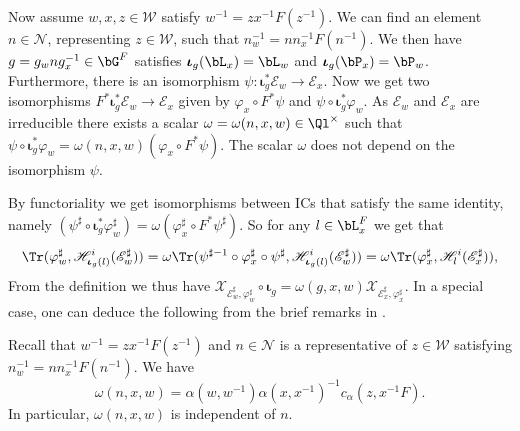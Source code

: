 \documentclass[eqthmnum,nocolour,skinny]{jt-calcs}
\begin{document}
\begin{pa}
Now assume $w,x,z \in \mathcal{W}$ satisfy $w^{-1} = zx^{-1}F(z^{-1})$. We can find an element $n \in \mathcal{N}$, representing $z \in \mathcal{W}$, such that $n_w^{-1} = nn_x^{-1}F(n^{-1})$. We then have $g = g_wng_x^{-1} \in \bG^F$ satisfies $\boldsymbol{\iota}_g(\bL_x) = \bL_w$ and $\boldsymbol{\iota}_g(\bP_x) = \bP_w$. Furthermore, there is an isomorphism $\psi : \boldsymbol{\iota}_g^*\mathscr{E}_w \to \mathscr{E}_x$. Now we get two isomorphisms $F^*\boldsymbol{\iota}_g^*\mathscr{E}_w \to \mathscr{E}_x$ given by $\varphi_x \circ F^*\psi$ and $\psi\circ \boldsymbol{\iota}_g^*\varphi_w$. As $\mathscr{E}_w$ and $\mathscr{E}_x$ are irreducible there exists a scalar $\omega = \omega(n,x,w) \in \Ql^{\times}$ such that $\psi\circ \boldsymbol{\iota}_g^*\varphi_w = \omega(n,x,w)(\varphi_x \circ F^*\psi)$. The scalar $\omega$ does not depend on the isomorphism $\psi$.
\end{pa}

\begin{pa}
By functoriality we get isomorphisms between ICs that satisfy the same identity, namely $(\psi^{\sharp}\circ \boldsymbol{\iota}_g^*\varphi_w^{\sharp}) = \omega(\varphi_x^{\sharp} \circ F^*\psi^{\sharp})$. So for any $l \in \bL_x^F$ we get that
\begin{equation*}
\Tr(\varphi_w^{\sharp},\mathscr{H}_{\boldsymbol{\iota}_g(l)}^i(\mathscr{E}_w^{\sharp})) = \omega\Tr(\psi^{\sharp -1}\circ\varphi_x^{\sharp} \circ \psi^{\sharp},\mathscr{H}_{\boldsymbol{\iota}_g(l)}^i(\mathscr{E}_w^{\sharp})) = \omega\Tr(\varphi_x^{\sharp},\mathscr{H}_l^i(\mathscr{E}_x^{\sharp})),
\end{equation*}
From the definition we thus have $\mathcal{X}_{\mathscr{E}_w^{\sharp},\varphi_w^{\sharp}} \circ \boldsymbol{\iota}_g = \omega(g,x,w)\mathcal{X}_{\mathscr{E}_x^{\sharp},\varphi_x^{\sharp}}$. In a special case, one can deduce the following from the brief remarks in \cite[10.6.4, 10.6.5]{lusztig:1985:character-sheaves}.
\end{pa}

\begin{prop}\label{prop:conj-scalar-calc}
Recall that $w^{-1} = zx^{-1}F(z^{-1})$ and $n \in \mathcal{N}$ is a representative of $z \in \mathcal{W}$ satisfying $n_w^{-1} = nn_x^{-1}F(n^{-1})$. We have
\begin{equation*}
\omega(n,x,w) = \alpha(w,w^{-1})\alpha(x,x^{-1})^{-1}c_{\alpha}(z,x^{-1}F).
\end{equation*}
In particular, $\omega(n,x,w)$ is independent of $n$.
\end{prop}
\end{document}
